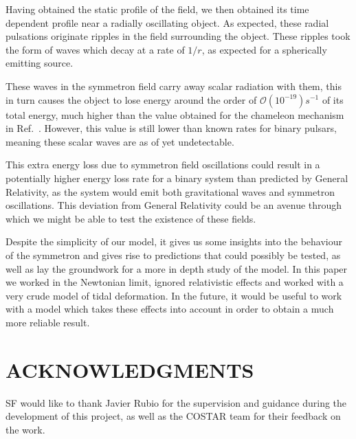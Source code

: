 \documentclass[nofootinbib,twocolumn]{revtex4}
\begin{document}
Having obtained the static profile of the field, we then obtained its time dependent profile near a radially oscillating object. 
As expected, these radial pulsations originate ripples in the field surrounding the object. 
These ripples took the form of waves which decay at a rate of $1/r$, as expected for a spherically emitting source.

These waves in the symmetron field carry away scalar radiation with them, this in turn causes the object to lose energy around the order of $\mathcal{O}(10^{-19}) s^{-1}$ of its total energy, much higher than the value obtained for the chameleon mechanism in Ref.~\cite{Silvestri:2011ch}. However, this value is still lower than known rates for binary pulsars, meaning these scalar waves are as of yet undetectable.

This extra energy loss due to symmetron field oscillations could result in a potentially higher energy loss rate for a binary system than predicted by General Relativity, as the system would emit both gravitational waves and symmetron oscillations. 
This deviation from General Relativity could be an avenue through which we might be able to test the existence of these fields.

Despite the simplicity of our model, it gives us some insights into the behaviour of the symmetron and gives rise to predictions that could possibly be tested, as well as lay the groundwork for a more in depth study of the model.
In this paper we worked in the Newtonian limit, ignored relativistic effects and worked with a very crude model of tidal deformation. 
In the future, it would be useful to work with a model which takes these effects into account in order to obtain a much more reliable result. 

\section*{\label{sec7}ACKNOWLEDGMENTS}
SF would like to thank Javier Rubio for the supervision and guidance during the development of this project, as well as the COSTAR team for their feedback on the work.


 
 
\end{document}

